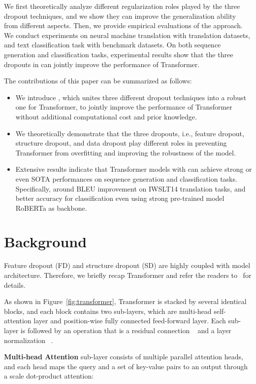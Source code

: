 \documentclass[11pt]{article}
\begin{document}
We first theoretically analyze different regularization roles played by the three dropout techniques, and we show they can improve the generalization ability from different aspects. Then, we provide empirical evaluations of the  approach. We conduct experiments on neural machine translation with  translation datasets, and text classification task with  benchmark datasets. On both sequence generation and classification tasks, experimental results show that the three dropouts in  can jointly improve the performance of Transformer.

The contributions of this paper can be summarized as follows:
\begin{itemize}
    \item We introduce , which unites three different dropout techniques into a robust one for Transformer, to jointly improve the performance of Transformer without additional computational cost and prior knowledge.
    \item We theoretically demonstrate that the three dropouts, i.e., feature dropout, structure dropout, and data dropout play different roles in preventing Transformer from overfitting and improving the robustness of the model.
    \item Extensive results indicate that Transformer models with  can achieve strong or even SOTA performances on sequence generation and classification tasks. Specifically, around  BLEU improvement on IWSLT14 translation tasks, and better accuracy for classification even using strong pre-trained model RoBERTa as backbone.
\end{itemize}

\section{Background}
\label{sec:background}
Feature dropout (FD) and structure dropout (SD) are highly coupled with model architecture. Therefore, we briefly recap Transformer and refer the readers to~\citet{vaswani2017attention} for details.

As shown in Figure~\ref{fig:transformer}, Transformer is stacked by several identical blocks, and each block contains two sub-layers, which are multi-head self-attention layer and position-wise fully connected feed-forward layer. Each sub-layer is followed by an  operation that is a residual connection ~\cite{he2016deep} and a layer normalization ~\cite{ba2016layer}.


\noindent \textbf{Multi-head Attention} sub-layer consists of multiple parallel attention heads,  and each head maps the query  and a set of key-value pairs  to an output through a scale dot-product attention:
\end{document}
